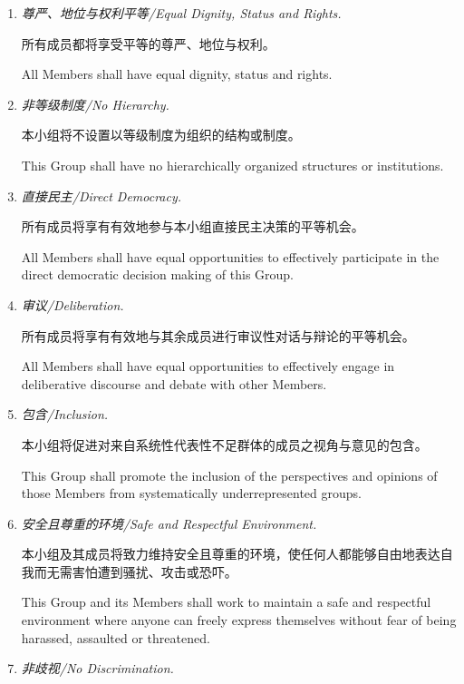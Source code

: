\documentclass[12pt]{aspasia-constitution}
\begin{document}
	\begin{enumerate}[leftmargin=1.25cm]
	\item \textit{尊严、地位与权利平等/Equal Dignity, Status and Rights.}\par\vspace{3pt}
	所有成员都将享受平等的尊严、地位与权利。\par
	All Members shall have equal dignity, status and rights.
	\item \textit{非等级制度/No Hierarchy.}\par\vspace{3pt}
	本小组将不设置以等级制度为组织的结构或制度。\par
	This Group shall have no hierarchically organized structures or institutions.
	\item \textit{直接民主/Direct Democracy.}\par\vspace{3pt}
	所有成员将享有有效地参与本小组直接民主决策的平等机会。\par
	All Members shall have equal opportunities to effectively participate in the direct democratic decision making of this Group.
	\item \textit{审议/Deliberation.}\par\vspace{3pt}
	所有成员将享有有效地与其余成员进行审议性对话与辩论的平等机会。\par
	All Members shall have equal opportunities to effectively engage in deliberative discourse and debate with other Members.
	\item \textit{包含/Inclusion.}\par\vspace{3pt}
	本小组将促进对来自系统性代表性不足群体的成员之视角与意见的包含。\par
	This Group shall promote the inclusion of the perspectives and opinions of those Members from systematically underrepresented groups.
	\item \textit{安全且尊重的环境/Safe and Respectful Environment.}\par\vspace{3pt}
	本小组及其成员将致力维持安全且尊重的环境，使任何人都能够自由地表达自我而无需害怕遭到骚扰、攻击或恐吓。\par
	This Group and its Members shall work to maintain a safe and respectful environment where anyone can freely express themselves without fear of being harassed, assaulted or threatened.
	\item \textit{非歧视/No Discrimination.}\par\vspace{3pt}

\end{enumerate}
\end{document}
